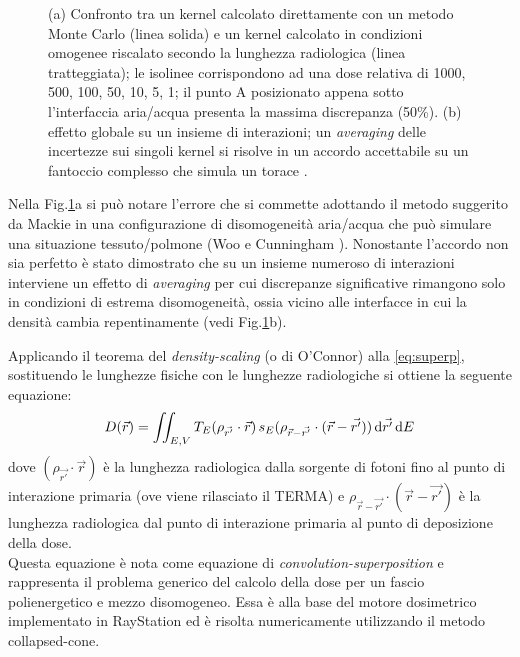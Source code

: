 {\begin{figure}[!t]
\caption{(a) Confronto tra un kernel calcolato direttamente con un metodo Monte Carlo (linea solida) e un kernel calcolato in condizioni omogenee riscalato secondo la lunghezza radiologica (linea tratteggiata); le isolinee corrispondono ad una dose relativa di 1000, 500, 100, 50, 10, 5, 1; il punto A posizionato appena sotto l'interfaccia aria/acqua presenta la massima discrepanza (50\%). (b) effetto globale su un insieme di interazioni; un \textit{averaging} delle incertezze sui singoli kernel si risolve in un accordo accettabile su un fantoccio complesso che simula un torace \cite{Woo1990,Arnfield2000,Ahnesjo1989}.}
\label{fig:kern_dens}
\end{figure}
Nella Fig.\ref{fig:kern_dens}a si può notare l'errore che si commette adottando il metodo suggerito da Mackie in una configurazione di disomogeneità aria/acqua che può simulare una situazione tessuto/polmone (Woo e Cunningham \cite{Woo1990}). Nonostante l'accordo non sia perfetto è stato dimostrato \cite{Ahnesjo1989} che su un insieme numeroso di interazioni interviene un effetto di \textit{averaging} per cui discrepanze significative rimangono solo in condizioni di estrema disomogeneità, ossia vicino alle interfacce in cui la densità cambia repentinamente (vedi Fig.\ref{fig:kern_dens}b).



Applicando il teorema del \textit{density-scaling} (o di O'Connor) alla \eqref{eq:superp}, sostituendo le lunghezze fisiche con le lunghezze radiologiche \cite{Khan2010} si ottiene la seguente equazione:
\begin{equation}
D(\vec{r}) = \iint_{E,V} T_E(\rho_{\vec{r'}} \cdot \vec{r})\, s_E(\rho_{\vec{r}-\vec{r'}}\cdot (\vec{r}-\vec{r'}))\,\text{d}\vec{r'} \,\text{d} E
\label{eq:superp_disom}
\end{equation}
dove $(\rho_{\vec{r'}} \cdot \vec{r})$ è la lunghezza radiologica dalla sorgente di fotoni fino al punto di interazione primaria (ove viene rilasciato il TERMA) e $\rho_{\vec{r}-\vec{r'}}\cdot (\vec{r}-\vec{r'})$ è la lunghezza radiologica dal punto di interazione primaria al punto di deposizione della dose.\\
Questa equazione è nota come equazione di \textit{convolution-superposition} e rappresenta il problema generico del calcolo della dose per un fascio polienergetico e mezzo disomogeneo. Essa è alla base del motore dosimetrico implementato in RayStation ed è risolta numericamente utilizzando il metodo collapsed-cone.

}
